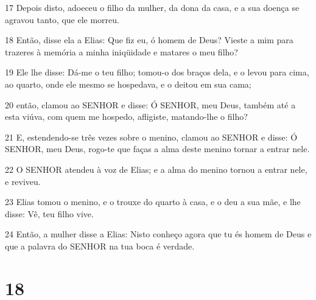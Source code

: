 \par 17 Depois disto, adoeceu o filho da mulher, da dona da casa, e a sua doença se agravou tanto, que ele morreu.
\par 18 Então, disse ela a Elias: Que fiz eu, ó homem de Deus? Vieste a mim para trazeres à memória a minha iniqüidade e matares o meu filho?
\par 19 Ele lhe disse: Dá-me o teu filho; tomou-o dos braços dela, e o levou para cima, ao quarto, onde ele mesmo se hospedava, e o deitou em sua cama;
\par 20 então, clamou ao SENHOR e disse: Ó SENHOR, meu Deus, também até a esta viúva, com quem me hospedo, afligiste, matando-lhe o filho?
\par 21 E, estendendo-se três vezes sobre o menino, clamou ao SENHOR e disse: Ó SENHOR, meu Deus, rogo-te que faças a alma deste menino tornar a entrar nele.
\par 22 O SENHOR atendeu à voz de Elias; e a alma do menino tornou a entrar nele, e reviveu.
\par 23 Elias tomou o menino, e o trouxe do quarto à casa, e o deu a sua mãe, e lhe disse: Vê, teu filho vive.
\par 24 Então, a mulher disse a Elias: Nisto conheço agora que tu és homem de Deus e que a palavra do SENHOR na tua boca é verdade.

\chapter{18}

